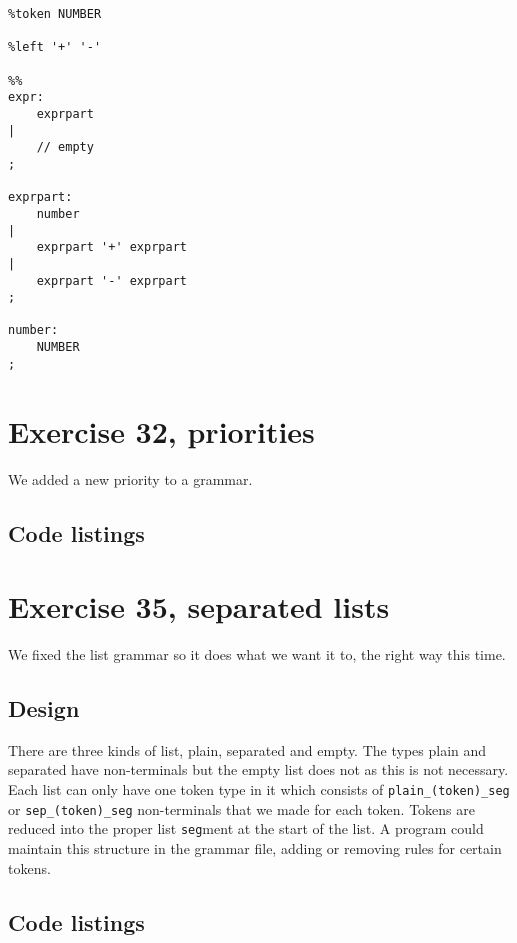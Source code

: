 \documentclass[11pt]{article}
\begin{document}
\begin{lstlisting}
%token NUMBER

%left '+' '-'

%%
expr:
	exprpart
|
	// empty
;

exprpart:
    number
|
    exprpart '+' exprpart
|
    exprpart '-' exprpart
;

number:
    NUMBER
;
\end{lstlisting}

\section*{Exercise 32, priorities}
We added a new priority to a grammar.

\subsection*{Code listings}


\section*{Exercise 35, separated lists}
We fixed the list grammar so it does what we want it to, the right way this time.

\subsection*{Design}
There are three kinds of list, plain, separated and empty.
The types plain and separated have non-terminals but the empty list does not as this is not necessary.
Each list can only have one token type in it which consists of \texttt{plain\_(token)\_seg} or \texttt{sep\_(token)\_seg} non-terminals that 
we made for each token.
Tokens are reduced into the proper list \texttt{seg}ment at the start of the list.
A program could maintain this structure in the grammar file, adding or removing rules for certain tokens.

\subsection*{Code listings}

\end{document}
